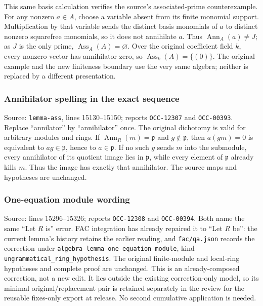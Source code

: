 This same basis calculation verifies the source's associated-prime counterexample. For any nonzero \(a\in A\), choose a variable absent from its finite monomial support. Multiplication by that variable sends the distinct basis monomials of \(a\) to distinct nonzero squarefree monomials, so it does not annihilate \(a\). Thus \(\operatorname{Ann}_A(a)\ne J\); as \(J\) is the only prime, \(\operatorname{Ass}_A(A)=\varnothing\). Over the original coefficient field \(k\), every nonzero vector has annihilator zero, so \(\operatorname{Ass}_k(A)=\{(0)\}\). The original example and the new finiteness boundary use the very same algebra; neither is replaced by a different presentation.

\subsubsection{Annihilator spelling in the exact sequence}\label{annihilator-spelling-in-the-exact-sequence}

Source: \texttt{lemma-ass}, lines 15130--15150; reports \texttt{OCC-12307} and \texttt{OCC-00393}. Replace ``annilator'' by ``annihilator'' once. The original dichotomy is valid for arbitrary modules and rings. If \(\operatorname{Ann}_R(m)=\mathfrak p\) and \(g\notin\mathfrak p\), then \(a(gm)=0\) is equivalent to \(ag\in\mathfrak p\), hence to \(a\in\mathfrak p\). If no such \(g\) sends \(m\) into the submodule, every annihilator of its quotient image lies in \(\mathfrak p\), while every element of \(\mathfrak p\) already kills \(m\). Thus the image has exactly that annihilator. The source maps and hypotheses are unchanged.

\subsubsection{One-equation module wording}\label{one-equation-module-wording}

Source: lines 15296--15326; reports \texttt{OCC-12308} and \texttt{OCC-00394}. Both name the same ``Let \(R\) is'' error. FAC integration has already repaired it to ``Let \(R\) be'': the current lemma's history retains the earlier reading, and \texttt{fac/qa.json} records the correction under \texttt{algebra-lemma-one-equation-module}, kind \texttt{ungrammatical\_ring\_hypothesis}. The original finite-module and local-ring hypotheses and complete proof are unchanged. This is an already-composed correction, not a new edit. It lies outside the existing correction-only model, so its minimal original/replacement pair is retained separately in the review for the reusable fixes-only export at release. No second cumulative application is needed.

